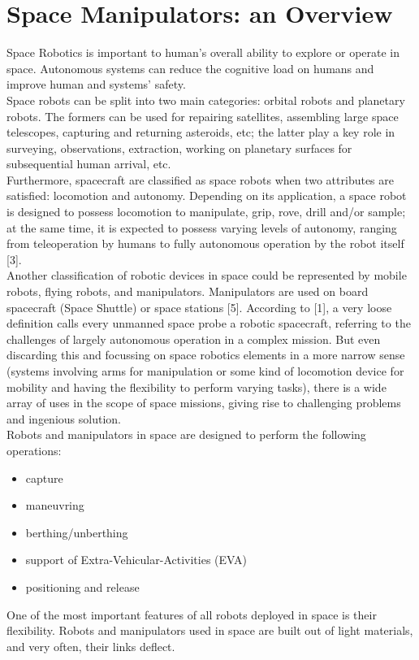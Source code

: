 \documentclass[a4paper,12pt,oneside]{report}
\begin{document}
\chapter{Space Manipulators: an Overview}
Space Robotics is important to human's overall ability to explore or operate in space. Autonomous systems can reduce the cognitive load on humans and improve human and systems' safety.\\
Space robots can be split into two main categories: orbital robots and planetary robots. The formers can be used for repairing satellites, assembling large space telescopes, capturing and returning asteroids, etc; the latter play a key role in surveying, observations, extraction, working on planetary surfaces for subsequential human arrival, etc.\\
Furthermore, spacecraft are classified as space robots when two attributes are satisfied: locomotion and autonomy. Depending on its application, a space robot is designed to possess locomotion to manipulate, grip, rove, drill and/or sample; at the same time, it is expected to possess varying levels of autonomy, ranging from teleoperation by humans to fully autonomous operation by the robot itself [3].\\
Another classification of robotic devices in space could be represented by mobile robots, flying robots, and manipulators. Manipulators are used on board spacecraft (Space Shuttle) or space stations [5].
According to [1], a very loose definition calls every unmanned space probe a robotic spacecraft, referring to the challenges of largely autonomous operation in a complex mission. But even discarding this and focussing on space robotics elements in a more narrow sense (systems involving arms for manipulation or some kind of locomotion device for mobility and having the flexibility to perform varying tasks), there is a wide array of uses in the scope of space missions, giving rise to challenging problems and ingenious solution.\\
Robots and manipulators in space are designed to perform the following operations:
\begin{itemize}
\item capture
\item maneuvring
\item berthing/unberthing
\item support of Extra-Vehicular-Activities (EVA)
\item positioning and release
\end{itemize}
One of the most important features of all robots deployed in space is their flexibility. Robots and manipulators used in space are built out of light materials, and very often, their links deflect.\\
\end{document}
